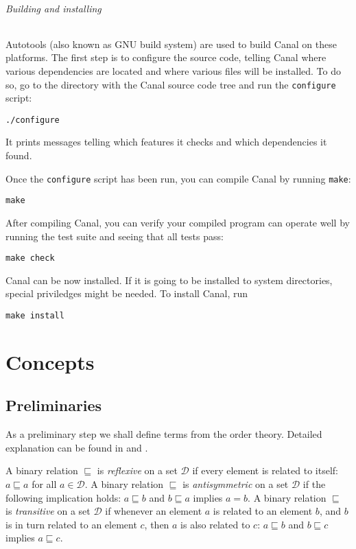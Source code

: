 \documentclass[a4paper]{book}
\begin{document}
\paragraph*{Building and installing}
Autotools (also known as GNU build system) are used to build Canal on
these platforms.  The first step is to configure the source code,
telling Canal where various dependencies are located and where various
files will be installed.  To do so, go to the directory with the
Canal source code tree and run the \texttt{configure} script:

\texttt{./configure}

It prints messages telling which features it checks and which
dependencies it found.

Once the \texttt{configure} script has been run, you can compile Canal
by running \texttt{make}:

\texttt{make}

After compiling Canal, you can verify your compiled program can
operate well by running the test suite and seeing that all tests pass:

\texttt{make check}

Canal can be now installed. If it is going to be installed to system
directories, special priviledges might be needed.  To install Canal,
run

\texttt{make install}

\part{Concepts}

\chapter{Preliminaries}

As a preliminary step we shall define terms from the order theory.
Detailed explanation can be found in \cite{DP02} and \cite{BCG02}.

A binary relation $\sqsubseteq$ is \emph{reflexive} on a set
$\mathcal{D}$ if every element is related to itself: $a \sqsubseteq a$
for all $a \in \mathcal{D}$.  A binary relation $\sqsubseteq$ is
\emph{antisymmetric} on a set $\mathcal{D}$ if the following
implication holds: $a \sqsubseteq b$ and $b \sqsubseteq a$ implies $a
= b$.  A binary relation $\sqsubseteq$ is \emph{transitive} on a set
$\mathcal{D}$ if whenever an element $a$ is related to an element $b$,
and $b$ is in turn related to an element $c$, then $a$ is also related
to $c$: $a \sqsubseteq b$ and $b \sqsubseteq c$ implies $a \sqsubseteq
c$.
\end{document}
